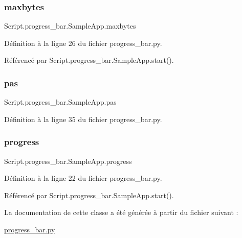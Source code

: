 \subsubsection{\texorpdfstring{maxbytes}{maxbytes}}
{\footnotesize\ttfamily Script.\+progress\+\_\+bar.\+Sample\+App.\+maxbytes}



Définition à la ligne 26 du fichier progress\+\_\+bar.\+py.



Référencé par Script.\+progress\+\_\+bar.\+Sample\+App.\+start().

\mbox{\label{classScript_1_1progress__bar_1_1SampleApp_a9904e1932de17caa7610352612c2e78c}} 
\subsubsection{\texorpdfstring{pas}{pas}}
{\footnotesize\ttfamily Script.\+progress\+\_\+bar.\+Sample\+App.\+pas}



Définition à la ligne 35 du fichier progress\+\_\+bar.\+py.

\mbox{\label{classScript_1_1progress__bar_1_1SampleApp_a355ba6fd4aa8e8bf5e29af65f8f20438}} 
\subsubsection{\texorpdfstring{progress}{progress}}
{\footnotesize\ttfamily Script.\+progress\+\_\+bar.\+Sample\+App.\+progress}



Définition à la ligne 22 du fichier progress\+\_\+bar.\+py.



Référencé par Script.\+progress\+\_\+bar.\+Sample\+App.\+start().



La documentation de cette classe a été générée à partir du fichier suivant \+:\begin{DoxyCompactItemize}
\item 
\hyperlink{progress__bar_8py}{progress\+\_\+bar.\+py}\end{DoxyCompactItemize}
